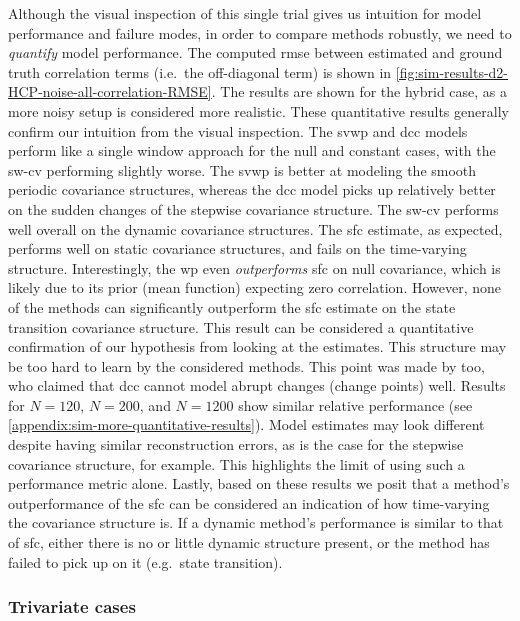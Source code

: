 Although the visual inspection of this single trial gives us intuition for model performance and failure modes, in order to compare methods robustly, we need to \emph{quantify} model performance.
The computed \gls{rmse} between estimated and ground truth correlation terms (i.e.~the off-diagonal term) is shown in \cref{fig:sim-results-d2-HCP-noise-all-correlation-RMSE}.
The results are shown for the hybrid case, as a more noisy setup is considered more realistic.
%
These quantitative results generally confirm our intuition from the visual inspection.
The \gls{svwp} and \gls{dcc} models perform like a single window approach for the null and constant cases, with the \gls{sw-cv} performing slightly worse.
The \gls{svwp} is better at modeling the smooth periodic covariance structures, whereas the \gls{dcc} model picks up relatively better on the sudden changes of the stepwise covariance structure.
The \gls{sw-cv} performs well overall on the dynamic covariance structures.
The \gls{sfc} estimate, as expected, performs well on static covariance structures, and fails on the time-varying structure.
Interestingly, the \gls{wp} even \emph{outperforms} \gls{sfc} on null covariance, which is likely due to its prior (mean function) expecting zero correlation.
%
However, none of the methods can significantly outperform the \gls{sfc} estimate on the state transition covariance structure.
This result can be considered a quantitative confirmation of our hypothesis from looking at the estimates.
This structure may be too hard to learn by the considered methods.
This point was made by \textcite{Lindquist2014} too, who claimed that \gls{dcc} cannot model abrupt changes (change points) well.
Results for $N = 120$, $N = 200$, and $N = 1200$ show similar relative performance (see \cref{appendix:sim-more-quantitative-results}).
%
Model estimates may look different despite having similar reconstruction errors, as is the case for the stepwise covariance structure, for example.
This highlights the limit of using such a performance metric alone.
%
Lastly, based on these results we posit that a method's outperformance of the \gls{sfc} can be considered an indication of how time-varying the covariance structure is.
If a dynamic method's performance is similar to that of \gls{sfc}, either there is no or little dynamic structure present, or the method has failed to pick up on it (e.g.~state transition).

\subsubsection{Trivariate cases}

